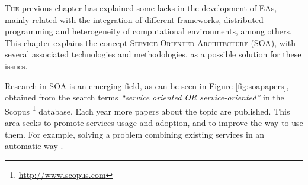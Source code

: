 \label{chap:soa} %
\minitoc\mtcskip
\vfill
\lettrine{T}{he} previous chapter has explained some lacks %
 in the development of EAs, mainly related with the integration of
 different frameworks, distributed programming and heterogeneity of
 computational environments, among others. This chapter explains the
 concept \textsc{Service Oriented Architecture} (SOA), with several
 associated technologies and methodologies, as a possible solution for
 these issues. %

Research in SOA \citep{Papazoglou2007SOA} is an emerging field, %
as can be seen in Figure \ref{fig:soapapers}, obtained from the search
terms {\em ``service oriented OR service-oriented''} in the Scopus
\footnote{\url{http://www.scopus.com}} database. Each year more papers
about the topic are published. This area seeks to promote services
usage and adoption, and to improve the way to use them. For example,
solving a problem combining existing services in an automatic way
\citep{Moussa2010ServiceComposition}. %





